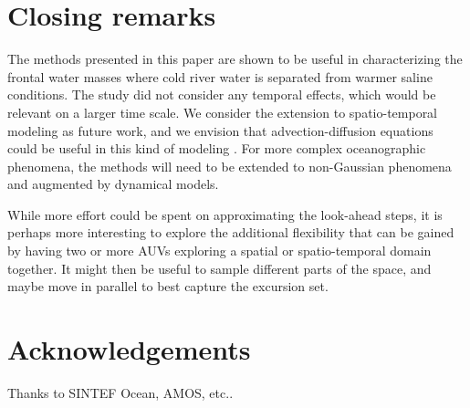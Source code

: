 \documentclass[aoas]{imsart}
\newcommand{\kcomment}[1]{{\color{red}{\{KR: #1\}}}}
\newcommand{\kc}{\kcomment}
\begin{document}


\section{Closing remarks}\label{sec:concl_disc}

The methods presented in this paper are shown to be useful in
characterizing the frontal water masses where cold river water is
separated from warmer saline conditions. The study did not consider
any temporal effects, which would be relevant on a larger time
scale. We consider the extension to spatio-temporal modeling as future
work, and we envision that advection-diffusion equations could be
useful in this kind of modeling \cite{sigrist2015stochastic}.  For
more complex oceanographic phenomena, the methods will need to be
extended to non-Gaussian phenomena and augmented by dynamical models.

While more effort could be spent on approximating the look-ahead
steps, it is perhaps more interesting to explore the additional
flexibility that can be gained by having two or more AUVs exploring a
spatial or spatio-temporal domain together. It might then be useful to
sample different parts of the space, and maybe move in parallel to
best capture the excursion set.

\section*{Acknowledgements}
Thanks to SINTEF Ocean, AMOS, etc..\kc{Complete}


\footnotesize




\end{document}
